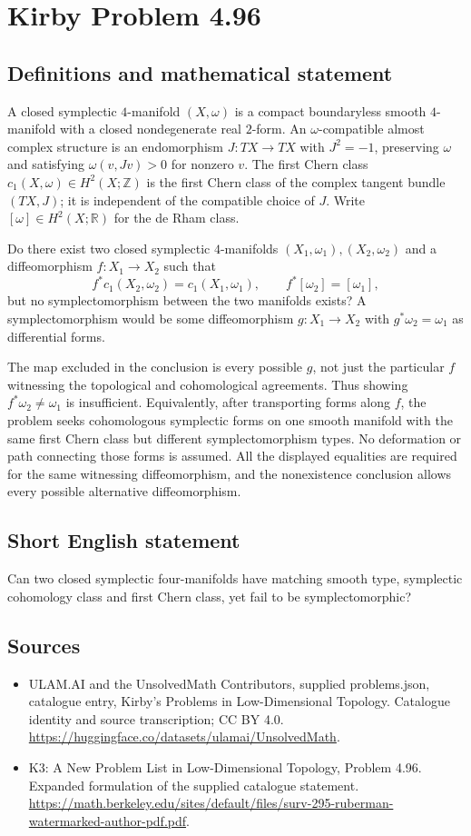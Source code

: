 \documentclass[11pt,a4paper]{article}
\begin{document}
\section*{Kirby Problem 4.96}\label{statement}

\subsection{Definitions and mathematical statement}
A closed symplectic $4$-manifold $(X,\omega)$ is a compact
boundaryless smooth $4$-manifold with a closed nondegenerate real
$2$-form. An $\omega$-compatible almost complex structure is an
endomorphism $J:TX\to TX$ with $J^2=-1$, preserving $\omega$
and satisfying $\omega(v,Jv)>0$ for nonzero $v$.
The first Chern class $c_1(X,\omega)\in H^2(X;\mathbb Z)$
is the first Chern class of the complex tangent bundle $(TX,J)$;
it is independent of the compatible choice of $J$.
Write $[\omega]\in H^2(X;\mathbb R)$ for the de Rham class.

Do there exist two closed symplectic $4$-manifolds
$(X_1,\omega_1),(X_2,\omega_2)$ and a diffeomorphism
$f:X_1\to X_2$ such that
\[
 f^*c_1(X_2,\omega_2)=c_1(X_1,\omega_1),\qquad
 f^*[\omega_2]=[\omega_1],
\]
but no symplectomorphism between the two manifolds exists?
A symplectomorphism would be some diffeomorphism $g:X_1\to X_2$
with $g^*\omega_2=\omega_1$ as differential forms.

The map excluded in the conclusion is every possible $g$, not
just the particular $f$ witnessing the topological and cohomological
agreements. Thus showing $f^*\omega_2\ne\omega_1$ is insufficient.
Equivalently, after transporting forms along $f$, the problem seeks
cohomologous symplectic forms on one smooth manifold with the same
first Chern class but different symplectomorphism types. No deformation
or path connecting those forms is assumed.
All the displayed equalities are required for the same witnessing
diffeomorphism, and the nonexistence conclusion allows every
possible alternative diffeomorphism.
\subsection{Short English statement}
Can two closed symplectic four-manifolds have matching smooth type, symplectic cohomology class and first Chern class, yet fail to be symplectomorphic?
\subsection{Sources}
\begin{itemize}
\item[S1] ULAM.AI and the UnsolvedMath Contributors, supplied problems.json, catalogue entry, Kirby's Problems in Low-Dimensional Topology. Catalogue identity and source transcription; CC BY 4.0.
\url{https://huggingface.co/datasets/ulamai/UnsolvedMath}.
\item[S2] K3: A New Problem List in Low-Dimensional Topology, Problem 4.96. Expanded formulation of the supplied catalogue statement.
\url{https://math.berkeley.edu/sites/default/files/surv-295-ruberman-watermarked-author-pdf.pdf}.
\end{itemize}
\end{document}

